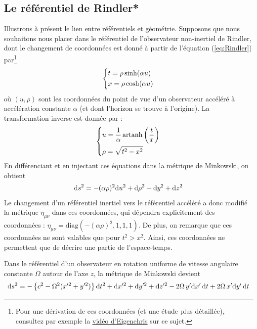 {\subsection{Le référentiel de Rindler*}
Illustrons à présent le lien entre référentiels et géométrie. Supposons que nous souhaitons nous placer dans le référentiel de l'observateur non-inertiel de Rindler, dont le changement de coordonnées est donné à partir de l'équation (\ref{eq:Rindler}) par\footnote{Pour une dérivation de ces coordonnées (et une étude plus détaillée), consultez par exemple la \href{https://youtu.be/O92pQXZaEnw}{vidéo d'Eigenchris} sur ce sujet.}
\begin{align}
    \begin{dcases}
        t = \rho \sinh (\alpha u) \\
        x = \rho \cosh (\alpha u)
    \end{dcases}
\end{align}
où $(u, \rho)$ sont les coordonnées du point de vue d'un observateur accéléré à accélération constante $\alpha$ (et dont l'horizon se trouve à l'origine). La transformation inverse est donnée par :
\begin{align}
    \begin{dcases}
        u = \frac{1}{\alpha} \, \mathrm{artanh}\left( \frac{t}{x} \right) \\
        \rho = \sqrt{t^2 - x^2}
    \end{dcases}
\end{align}
En différenciant et en injectant ces équations dans la métrique de Minkowski, on obtient
\begin{equation}
    \mathrm{d} s^2 = - (\alpha \rho)^2 \mathrm{d} u^2 + \mathrm{d} \rho^2 + \mathrm{d}  y^2 + \mathrm{d}  z^2
\end{equation}
Le changement d'un référentiel inertiel vers le référentiel accéléré a donc modifié la métrique $\eta_{\mu\nu}$ dans ces coordonnées, qui dépendra explicitement des coordonnées : $ \eta_{\mu\nu} = \mathrm{diag} (-(\alpha \rho)^2, 1, 1,1)$. De plus, on remarque que ces coordonnées ne sont valables que pour $t^2>x^2$. Ainsi, ces coordonnées ne permettent que de décrire une partie de l'espace-temps. 
\begin{exmp}
    Dans le référentiel d'un observateur en rotation uniforme de vitesse angulaire constante $\Omega$ autour de l'axe $z$, la métrique de Minkowski devient
    \begin{equation}
        \td s^2 = -\ltc c^2 - \Omega^2 (x'^2 + y'^2) \rtc \td t^2 + \td x'^2 +\td y'^2 + \td z'^2 - 2\Omega \,y' \td x' \, \td t + 2\Omega\, x' \td y'\, \td t

\end{equation}
\end{exmp}}
